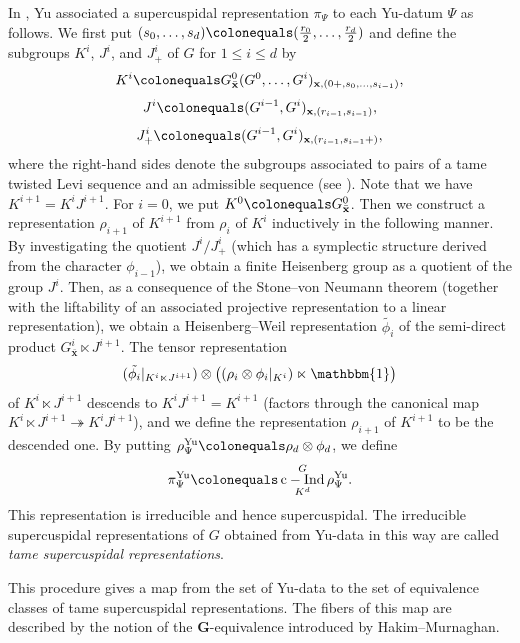 \documentclass{amsart}
\newcommand{\Yu}{\mathrm{Yu}}
\newcommand{\x}{\mathbf{x}}
\newcommand{\bfG}{\mathbf{G}}
\DeclareMathOperator{\cInd}{c-Ind}
\theoremstyle{plain}
\theoremstyle{definition}
\theoremstyle{remark}
\theoremstyle{theorem}
\begin{document}
In \cite{Yu01}, Yu associated a supercuspidal representation $\pi_{\Psi}$ to each Yu-datum $\Psi$ as follows.
We first put $(s_{0},\ldots,s_{d})\colonequals(\frac{r_{0}}{2},\ldots,\frac{r_{d}}{2})$ and define the subgroups $K^{i}$, $J^{i}$, and $J^{i}_{+}$ of $G$ for $1\leq i \leq d$ by
\[
K^{i}
\colonequals 
G^{0}_{\bar{\x}}(G^{0},\ldots,G^{i})_{\x,(0+,s_{0},\ldots,s_{i-1})},
\]
\[
J^{i}
\colonequals 
(G^{i-1},G^{i})_{\x,(r_{i-1},s_{i-1})},
\]
\[
J^{i}_{+}
\colonequals 
(G^{i-1},G^{i})_{\x,(r_{i-1},s_{i-1}+)},
\]
where the right-hand sides denote the subgroups associated to pairs of a tame twisted Levi sequence and an admissible sequence (see \cite[Sections 1 and 2]{Yu01}).
Note that we have $K^{i+1}=K^{i}J^{i+1}$.
For $i=0$, we put $K^{0}\colonequals G^{0}_{\bar{\x}}$.
Then we construct a representation $\rho_{i+1}$ of $K^{i+1}$ from $\rho_{i}$ of $K^{i}$ inductively in the following manner.
By investigating the quotient $J^{i}/J^{i}_{+}$ (which has a symplectic structure derived from the character $\phi_{i-1}$), we obtain a finite Heisenberg group as a quotient of the group $J^{i}$.
Then, as a consequence of the Stone--von Neumann theorem (together with the liftability of an associated projective representation to a linear representation), we obtain a Heisenberg--Weil representation $\tilde{\phi_{i}}$ of the semi-direct product $G^{i}_{\bar{\x}}\ltimes J^{i+1}$.
The tensor representation 
\[
(\tilde{\phi_{i}}|_{K^{i}\ltimes J^{i+1}})
\otimes 
\bigl((\rho_{i}\otimes\phi_{i}|_{K^{i}})\ltimes\mathbbm{1}\bigr)
\]
of $K^{i}\ltimes J^{i+1}$ descends to $K^{i}J^{i+1}=K^{i+1}$ (factors through the canonical map $K^{i}\ltimes J^{i+1}\twoheadrightarrow K^{i}J^{i+1}$), and we define the representation $\rho_{i+1}$ of $K^{i+1}$ to be the descended one.
By putting $\rho_{\Psi}^{\Yu}\colonequals \rho_{d}\otimes\phi_{d}$, we define
\[
\pi_{\Psi}^{\Yu}\colonequals \cInd_{K^{d}}^{G}\rho_{\Psi}^{\Yu}.
\]
This representation is irreducible \cite{Yu01, Fin21-Compos} and hence supercuspidal.
The irreducible supercuspidal representations of $G$ obtained from Yu-data in this way are called \textit{tame supercuspidal representations}.

This procedure gives a map from the set of Yu-data to the set of equivalence classes of tame supercuspidal representations.
The fibers of this map are described by the notion of the $\bfG$-equivalence introduced by Hakim--Murnaghan.
\end{document}
